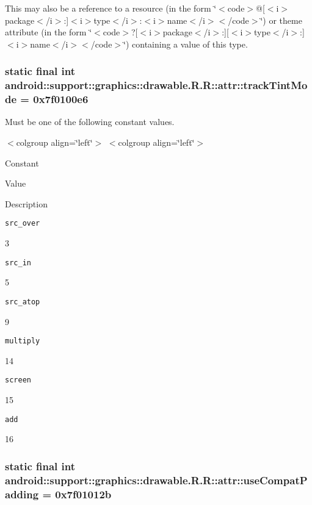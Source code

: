 This may also be a reference to a resource (in the form \char`\"{}$<$code$>$@\mbox{[}$<$i$>$package$<$/i$>$:\mbox{]}$<$i$>$type$<$/i$>$:$<$i$>$name$<$/i$>$$<$/code$>$\char`\"{}) or theme attribute (in the form \char`\"{}$<$code$>$?\mbox{[}$<$i$>$package$<$/i$>$:\mbox{]}\mbox{[}$<$i$>$type$<$/i$>$:\mbox{]}$<$i$>$name$<$/i$>$$<$/code$>$\char`\"{}) containing a value of this type. \hypertarget{classandroid_1_1support_1_1graphics_1_1drawable_1_1_r_1_1attr_76313f1b5989f46b0987a2e0b9df508b}{
\subsubsection[{trackTintMode}]{\setlength{\rightskip}{0pt plus 5cm}static final int android::support::graphics::drawable.R.R::attr::trackTintMode = 0x7f0100e6}}
\label{classandroid_1_1support_1_1graphics_1_1drawable_1_1_r_1_1attr_76313f1b5989f46b0987a2e0b9df508b}


Must be one of the following constant values. \begin{TabularC}{0}
\hline
\end{TabularC}
$<$colgroup align=\char`\"{}left\char`\"{}$>$ $<$colgroup align=\char`\"{}left\char`\"{}$>$ 

Constant

Value

Description 

{\tt src\_\-over}

3

{\tt src\_\-in}

5

{\tt src\_\-atop}

9

{\tt multiply}

14

{\tt screen}

15

{\tt add}

16\hypertarget{classandroid_1_1support_1_1graphics_1_1drawable_1_1_r_1_1attr_7f4e3ec8fb44c7785a68f87c664574b1}{
\subsubsection[{useCompatPadding}]{\setlength{\rightskip}{0pt plus 5cm}static final int android::support::graphics::drawable.R.R::attr::useCompatPadding = 0x7f01012b}}
\label{classandroid_1_1support_1_1graphics_1_1drawable_1_1_r_1_1attr_7f4e3ec8fb44c7785a68f87c664574b1}



